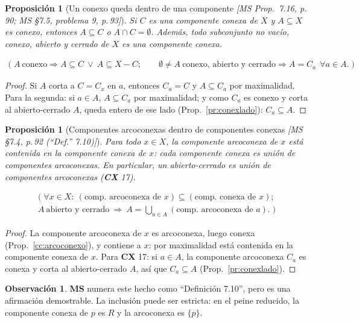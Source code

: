 \documentclass[11pt,a4paper]{article}
\newcommand{\lgc}[1]{\par\vspace{-3pt}\begin{gather*}\big(\;#1\;\big)\end{gather*}\vspace{-6pt}}
\theoremstyle{definition}
\newtheorem{observacion}[definicion]{Observación}
\theoremstyle{plain}
\newtheorem{proposicion}[definicion]{Proposición}
\newcommand{\fnt}[1]{{\normalfont\small\itshape\color{gray!150!black}[#1]}}
\begin{document}
\begin{proposicion}[Un conexo queda dentro de una componente \fnt{MS Prop.\ 7.16, p.\,90; MS \S7.5, problema 9, p.\,93}]\label{cc:dentrocomp}
Si $C$ es una componente conexa de $X$ y $A\subseteq X$ es conexo, entonces $A\subseteq C$ o $A\cap C=\emptyset$. Además, todo subconjunto no vacío, conexo, abierto y cerrado de $X$ es una componente conexa.
\lgc{A\ \text{conexo}\Rightarrow A\subseteq C\ \vee\ A\subseteq X-C;\qquad \emptyset\ne A\ \text{conexo, abierto y cerrado}\Rightarrow A=C_a\ \ \forall a\in A.}
\end{proposicion}

\begin{proof}
Si $A$ corta a $C=C_x$ en $a$, entonces $C_a=C$ y $A\subseteq C_a$ por maximalidad. Para la segunda: si $a\in A$, $A\subseteq C_a$ por maximalidad; y como $C_a$ es conexo y corta al abierto-cerrado $A$, queda entero de ese lado (Prop.~\ref{pr:conexlado}): $C_a\subseteq A$.
\end{proof}

\begin{proposicion}[Componentes arcoconexas dentro de componentes conexas \fnt{MS \S7.4, p.\,92 (``Def.'' 7.10)}]\label{cc:cenC}
Para todo $x\in X$, la componente arcoconexa de $x$ está contenida en la componente conexa de $x$: cada componente conexa es unión de componentes arcoconexas. En particular, un abierto-cerrado es unión de componentes arcoconexas (\textbf{CX} 17).
\lgc{\forall x\in X:\ (\text{comp.\ arcoconexa de } x)\subseteq(\text{comp.\ conexa de } x);\\ A\ \text{abierto y cerrado}\ \Rightarrow\ A=\textstyle\bigcup_{a\in A}(\text{comp.\ arcoconexa de } a).}
\end{proposicion}

\begin{proof}
La componente arcoconexa de $x$ es arcoconexa, luego conexa (Prop.~\ref{cc:arcoconexo}), y contiene a $x$: por maximalidad está contenida en la componente conexa de $x$. Para \textbf{CX} 17: si $a\in A$, la componente arcoconexa $C_a$ es conexa y corta al abierto-cerrado $A$, así que $C_a\subseteq A$ (Prop.~\ref{pr:conexlado}).
\end{proof}

\begin{observacion}
\textbf{MS} numera este hecho como ``Definición 7.10'', pero es una afirmación demostrable. La inclusión puede ser estricta: en el peine reducido, la componente conexa de $p$ es $R$ y la arcoconexa es $\{p\}$.
\end{observacion}
\end{document}
